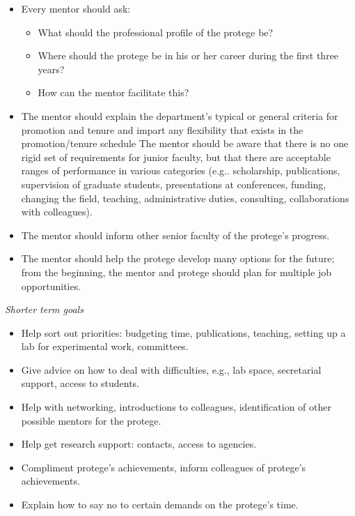 \begin{itemize}
\item
	Every mentor should ask:

\begin{itemize}
\item
		What should the professional profile of the protege be?
\item
		Where should the protege be in his or her career during the first three years?
\item
		How can the mentor facilitate this?
\end{itemize}

\item
	The mentor should explain the department's typical or general criteria for promotion 
and tenure and impart any flexibility that exists in the promotion/tenure 
schedule  The mentor should be aware that there is no one rigid set of 
requirements for junior faculty, but that there are acceptable ranges of 
performance in various categories (e.g.. scholarship, publications, supervision of 
graduate students, presentations at conferences, funding, changing the field, 
teaching, administrative duties, consulting, collaborations with colleagues).
\item
	The mentor should inform other senior faculty of the protege's progress.
\item
	The mentor should help the protege develop many options for the future; from 
the beginning, the mentor and protege should plan for multiple job 
opportunities.

\end{itemize}

\noindent
{\sl Shorter term goals}



\begin{itemize}

\item
	Help sort out priorities: budgeting time, publications, teaching, setting up a lab 
for experimental work, committees.
\item
	Give advice on how to deal with difficulties, e.g., lab space, secretarial support, 
access to students.
\item
	Help with networking, introductions to colleagues, identification of other possible 
mentors for the protege.
\item
	Help get research support: contacts, access to agencies.
\item
	Compliment protege's achievements, inform colleagues of protege's achievements.
\item
	Explain how to say no to certain demands on the protege's time.

\end{itemize}


